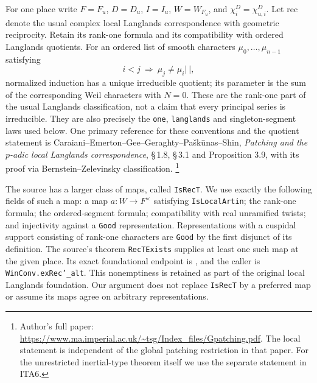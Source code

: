 \documentclass[11pt,a4paper]{article}
\numberwithin{equation}{section}
\theoremstyle{remark}\newtheorem{remark}[theorem]{Remark}
\begin{document}
For one place write $F=F_u$, $D=D_u$, $I=I_u$, $W=W_{F_u}$,
and $\chi_i^D=\chi^D_{u,i}$.  Let $\mathrm{rec}$ denote
the usual complex local Langlands correspondence with geometric
reciprocity.  Retain its rank-one formula and its compatibility
with ordered Langlands quotients.  For an ordered list of smooth
characters $\mu_0,\ldots,\mu_{n-1}$ satisfying
\[
                  i<j\ \Longrightarrow\ \mu_j\ne\mu_i|\ |,
                                                               \tag{ITA.8}
\]
normalized induction has a unique irreducible quotient; its
parameter is the sum of the corresponding Weil characters with
$N=0$.  These are the rank-one part of the usual Langlands
classification, not a claim that every principal series is
irreducible.  They are also precisely the \texttt{one},
\texttt{langlands} and singleton-segment laws used below.
One primary reference for these conventions and the quotient
statement is Caraiani--Emerton--Gee--Geraghty--Pa\v{s}k\={u}nas--Shin,
\emph{Patching and the $p$-adic local Langlands correspondence},
\S\,1.8, \S\,3.1 and Proposition 3.9, with its proof via
Bernstein--Zelevinsky classification.
\footnote{Author's full paper:
\url{https://www.ma.imperial.ac.uk/~tsg/Index_files/Gpatching.pdf}.
The local statement is independent of the global patching
restriction in that paper.  For the unrestricted inertial-type
theorem itself we use the separate statement in ITA6.}

The source has a larger class of maps, called \texttt{Is\allowbreak Rec\allowbreak T}.
We use exactly the following fields of such a map: a map
$a:W\to F^\times$ satisfying \texttt{Is\allowbreak Local\allowbreak Artin}; the
rank-one formula; the ordered-segment formula; compatibility
with real unramified twists; and injectivity against a
\texttt{Good} representation.  Representations with a
cuspidal support consisting of rank-one characters are
\texttt{Good} by the first disjunct of its definition.
The source's theorem \texttt{Rec\allowbreak TExists} supplies at least
one such map at the given place.  Its exact foundational
endpoint is
,
and the caller is \texttt{Win\allowbreak Conv.\allowbreak ex\allowbreak Rec'\_\allowbreak alt}.  This
nonemptiness is retained as part of the original local
Langlands foundation.  Our argument does not replace
\texttt{Is\allowbreak Rec\allowbreak T} by a preferred map or assume its maps agree
on arbitrary representations.

\end{document}
